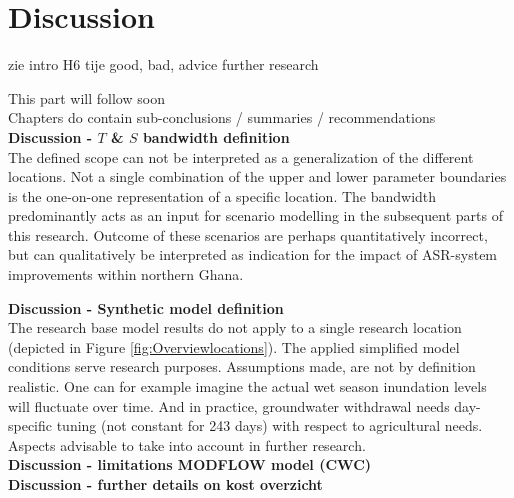 \chapter{Discussion}
\label{chapter:discussion}
zie intro H6 tije
good, bad, advice further research

This part will follow soon \\
Chapters do contain sub-conclusions / summaries / recommendations \\

\textbf{Discussion - $T$ \& $S$ bandwidth definition} \\
The defined scope can not be interpreted as a generalization of the different locations. Not a single combination of the upper and lower parameter boundaries is the one-on-one representation of a specific location. The bandwidth predominantly acts as an input for scenario modelling in the subsequent parts of this research. Outcome of these scenarios are perhaps quantitatively incorrect, but can qualitatively be interpreted as indication for the impact of ASR-system improvements within northern Ghana. 

\textbf{Discussion - Synthetic model definition} \\
The research base model results do not apply to a single research location (depicted in Figure \ref{fig:Overviewlocations}). The applied simplified model conditions serve research purposes. Assumptions made, are not by definition realistic. One can for example imagine the actual wet season inundation levels will fluctuate over time. And in practice, groundwater withdrawal needs day-specific tuning (not constant for 243 days) with respect to agricultural needs. Aspects advisable to take into account in further research.\\

\textbf{Discussion - limitations MODFLOW model (CWC)} \\

\textbf{Discussion - further details on kost overzicht} \\